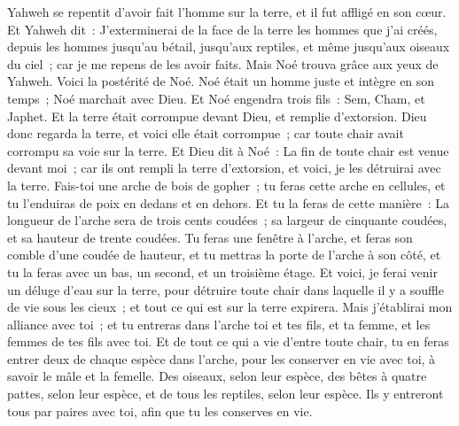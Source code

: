 \begin{multicols}{2}
Yahweh se repentit d'avoir fait l'homme sur la terre, et il fut affligé en son cœur.
Et Yahweh dit~: J'exterminerai de la face de la terre les hommes que j'ai créés, depuis les hommes jusqu'au bétail, jusqu'aux reptiles, et même jusqu'aux oiseaux du ciel~; car je me repens de les avoir faits.
Mais Noé trouva grâce aux yeux de Yahweh.
Voici la postérité de Noé. Noé était un homme juste et intègre en son temps~; Noé marchait avec Dieu.
Et Noé engendra trois fils~: Sem, Cham, et Japhet.
Et la terre était corrompue devant Dieu, et remplie d'extorsion.
Dieu donc regarda la terre, et voici elle était corrompue~; car toute chair avait corrompu sa voie sur la terre.
Et Dieu dit à Noé~: La fin de toute chair est venue devant moi~; car ils ont rempli la terre d'extorsion, et voici, je les détruirai avec la terre.
Fais-toi une arche de bois de gopher~; tu feras cette arche en cellules, et tu l'enduiras de poix en dedans et en dehors.
Et tu la feras de cette manière~: La longueur de l'arche sera de trois cents coudées~; sa largeur de cinquante coudées, et sa hauteur de trente coudées.
Tu feras une fenêtre à l'arche, et feras son comble d'une coudée de hauteur, et tu mettras la porte de l'arche à son côté, et tu la feras avec un bas, un second, et un troisième étage.
Et voici, je ferai venir un déluge d'eau sur la terre, pour détruire toute chair dans laquelle il y a souffle de vie sous les cieux~; et tout ce qui est sur la terre expirera.
Mais j'établirai mon alliance avec toi~; et tu entreras dans l'arche toi et tes fils, et ta femme, et les femmes de tes fils avec toi.
Et de tout ce qui a vie d'entre toute chair, tu en feras entrer deux de chaque espèce dans l'arche, pour les conserver en vie avec toi, à savoir le mâle et la femelle.
Des oiseaux, selon leur espèce, des bêtes à quatre pattes, selon leur espèce, et de tous les reptiles, selon leur espèce. Ils y entreront tous par paires avec toi, afin que tu les conserves en vie.

\end{multicols}
